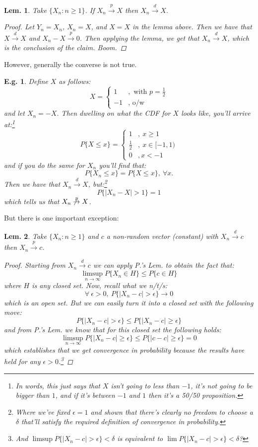 \documentclass{tufte-book}
\theoremstyle{mytheoremstyle}
\theoremstyle{mylemstyle}
\newtheorem*{lem}{Lem.}
\theoremstyle{mydefstyle}
\newtheorem*{ex}{E.g.}
\begin{document}
\begin{lem} Take \(\{X_n: n \ge 1\}\). If \(X_n \overset{p}{\rightarrow} X\) then \(X_n \overset{d}{\rightarrow} X\). 
	\begin{proof} Let \(Y_n = X_n\), \(X_n = X\), and \(X = X\) in the lemma above. Then we have that \(X \overset{d}{\rightarrow} X\) and \(X_n - X \overset{p}{\rightarrow} 0\). Then applying the lemma, we get that \(X_n \overset{d}{\rightarrow} X\), which is the conclusion of the claim. Boom.
	\end{proof}
\end{lem}

\noindent However, generally the converse is not true.
\begin{ex} Define \(X\) as follows:
	\[X = \begin{cases} 1 &, \mbox{ with } p = \frac{1}{2} \\
					-1 &, \mbox{ o/w} \end{cases}\]
and let \(X_n = -X\). Then dwelling on what the CDF for \(X\) looks like, you'll arrive at:\footnote{In words, this just says that \(X\) isn't going to less than \(-1\), it's not going to be bigger than \(1\), and if it's between \(-1\) and \(1\) then it's a 50/50 proposition.}
	\[P\{X \le x\} = \begin{cases} 1 &,\ x \ge 1 \\
						\frac{1}{2} &,\ x \in [-1, 1) \\
						0 &, x < -1\end{cases} \]
and if you do the same for \(X_n\) you'll find that:
	\[P\{X_n \le x\} = P\{X \le x\},\ \forall x\text{.}\]
Then we have that \(X_n \overset{d}{\rightarrow} X\), but:\footnote{Where we've fixed \(\epsilon = 1\) and shown that there's clearly no freedom to choose a \(\delta\) that'll satisfy the required definition of convergence in probability.}
	\[P\{|X_n - X| > 1\} = 1\] 
which tells us that \(X_n \not \overset{p}{\rightarrow} X\).
\end{ex}

But there is one important exception:
\begin{lem} Take \(\{X_n: n \ge 1\}\) and \(c\) a non-random vector (constant) with \(X_n \overset{d}{\rightarrow} c\) then \(X_n \overset{p}{\rightarrow} c\).
	\begin{proof} Starting from \(X_n \overset{d}{\rightarrow} c\) we can apply P.'s Lem. to obtain the fact that:
		\[\limsup_{n \rightarrow \infty} P\{X_n \in H\} \le P\{c \in H\}\]
	where \(H\) is any closed set. Now, recall what we n/t/s:
		\[\forall\ \epsilon > 0,\ P\{|X_n - c| > \epsilon\} \rightarrow 0\]
	which is an open set. But we can easily turn it into a closed set with the following move:
		\[P\{|X_n - c| > \epsilon\} \le P\{|X_n - c| \ge \epsilon\}\]
	and from P.'s Lem. we know that for this closed set the following holds:
		\[\limsup_{n \rightarrow \infty} P\{|X_n - c| \ge \epsilon\} \le P\{|c-c| \ge \epsilon\} = 0\]
	which establishes that we get convergence in probability because the results have held for any \(\epsilon > 0\).\footnote{And \(\limsup P\{|X_n - c| > \epsilon\} < \delta\) is equivalent to \(\lim P\{|X_n - c| > \epsilon\} < \delta\)?}
	\end{proof}
\end{lem}
\end{document}
